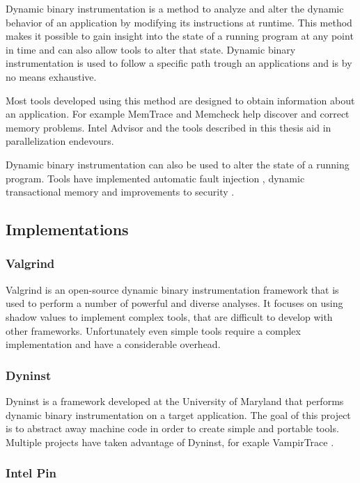 Dynamic binary instrumentation is a method to analyze and alter the dynamic behavior of an application by modifying its instructions at runtime. This method makes it possible to gain insight into the state of a running program at any point in time and can also allow tools to alter that state. Dynamic binary instrumentation is used to follow a specific path trough an applications and is by no means exhaustive.

Most tools developed using this method are designed to obtain information about an application. For example MemTrace \cite{pindoc} and Memcheck \cite{memcheck} help discover and correct memory problems. Intel Advisor \cite{inteladvisor} and the tools described in this thesis aid in parallelization endevours.

Dynamic binary instrumentation can also be used to alter the state of a running program. Tools have implemented automatic fault injection \cite{faultinject}, dynamic transactional memory \cite{dynamicstm} and improvements to security \cite{dynamicstackprotect}.

\subsection{Implementations}

\subsubsection{Valgrind}

Valgrind \cite{valgrind} is an open-source dynamic binary instrumentation framework that is used to perform a number of powerful and diverse analyses. It focuses on using shadow values to implement complex tools, that are difficult to develop with other frameworks. Unfortunately even simple tools require a complex implementation and have a considerable overhead.

\subsubsection{Dyninst}

Dyninst \cite{dyninst} is a framework developed at the University of Maryland that performs dynamic binary instrumentation on a target application. The goal of this project is to abstract away machine code in order to create simple and portable tools. Multiple projects have taken advantage of Dyninst, for exaple VampirTrace \cite{vampirtrace}.

\subsubsection{Intel Pin}

